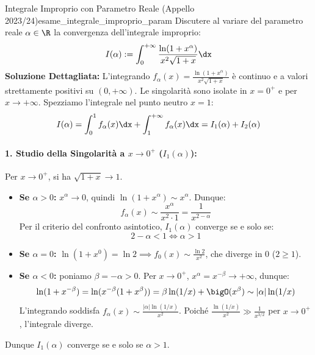 \begin{esempio}{Integrale Improprio con Parametro Reale (Appello 2023/24)}{esame_integrale_improprio_param}
Discutere al variare del parametro reale $\alpha \in \R$ la convergenza dell'integrale improprio:
\[
    I(\alpha) := \int_0^{+\infty} \frac{\ln(1 + x^\alpha)}{x^2 \sqrt{1 + x}} \dx
\]
\tcblower
\textbf{Soluzione Dettagliata:}
L'integrando $f_\alpha(x) = \frac{\ln(1 + x^\alpha)}{x^2 \sqrt{1 + x}}$ è continuo e a valori strettamente positivi su $(0, +\infty)$.
Le singolarità sono isolate in $x = 0^+$ e per $x \to +\infty$. Spezziamo l'integrale nel punto neutro $x = 1$:
\[
    I(\alpha) = \int_0^1 f_\alpha(x)\dx + \int_1^{+\infty} f_\alpha(x)\dx = I_1(\alpha) + I_2(\alpha)
\]

\paragraph{1. Studio della Singolarità a $x \to 0^+$ ($I_1(\alpha)$):}
Per $x \to 0^+$, si ha $\sqrt{1 + x} \to 1$.
\begin{itemize}
    \item \textbf{Se $\alpha > 0$:} $x^\alpha \to 0$, quindi $\ln(1 + x^\alpha) \sim x^\alpha$.
    Dunque:
    \[
        f_\alpha(x) \sim \frac{x^\alpha}{x^2 \cdot 1} = \frac{1}{x^{2 - \alpha}}
    \]
    Per il criterio del confronto asintotico, $I_1(\alpha)$ converge se e solo se:
    \[
        2 - \alpha < 1 \iff \alpha > 1
    \]
    \item \textbf{Se $\alpha = 0$:} $\ln(1 + x^0) = \ln 2 \implies f_0(x) \sim \frac{\ln 2}{x^2}$, che diverge in $0$ ($2 \ge 1$).
    \item \textbf{Se $\alpha < 0$:} poniamo $\beta = -\alpha > 0$. Per $x \to 0^+$, $x^\alpha = x^{-\beta} \to +\infty$, dunque:
    \[
        \ln(1 + x^{-\beta}) = \ln(x^{-\beta}(1 + x^\beta)) = \beta\ln(1/x) + \bigO(x^\beta) \sim |\alpha|\ln(1/x)
    \]
    L'integrando soddisfa $f_\alpha(x) \sim \frac{|\alpha|\ln(1/x)}{x^2}$. Poiché $\frac{\ln(1/x)}{x^2} \gg \frac{1}{x^{3/2}}$ per $x \to 0^+$, l'integrale diverge.
\end{itemize}
Dunque $I_1(\alpha)$ converge se e solo se $\alpha > 1$.


\end{esempio}
